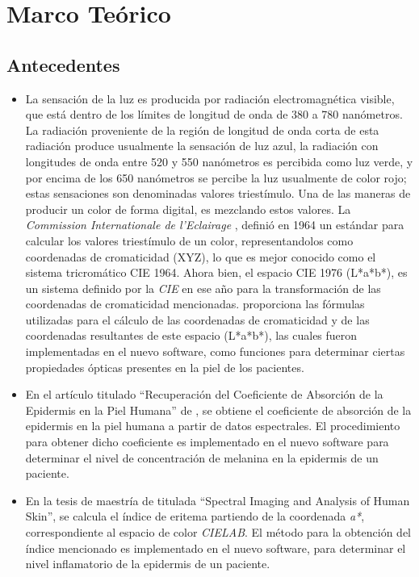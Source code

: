 \chapter{\label{cap:2}Marco Te\'{o}rico}

	\section{Antecedentes}	
		\begin{itemize}
		
			\item
				La sensaci\'{o}n de la luz es producida por radiaci\'{o}n electromagn\'{e}tica visible, que est\'{a} dentro de los l\'{i}mites de longitud de onda de 380 a 780 nan\'{o}metros. La radiaci\'{o}n proveniente de la regi\'{o}n de longitud de onda corta de esta radiaci\'{o}n produce usualmente la sensaci\'{o}n de luz azul, la radiaci\'{o}n con longitudes de onda entre 520 y 550 nan\'{o}metros es percibida como luz verde, y por encima de los 650 nan\'{o}metros se percibe la luz usualmente de color rojo; estas sensaciones son denominadas valores triest\'{i}mulo. Una de las maneras de producir un color de forma digital, es mezclando estos valores. La \textit{\mbox{Commission} Internationale de l'Eclairage} \cite{CIE}, defini\'{o} en 1964 un est\'{a}ndar para calcular los valores triest\'{i}mulo de un color, representandolos como coordenadas de cromaticidad (XYZ), lo que es mejor conocido como el sistema tricrom\'{a}tico CIE 1964. Ahora bien, el espacio CIE 1976 (L*a*b*), es un sistema definido por la \textit{CIE} en ese a\~{n}o para la \mbox{transformaci\'{o}n} de las coordenadas de cromaticidad mencionadas.\cite{Schanda} proporciona las f\'{o}rmulas utilizadas para el c\'{a}lculo de las coordenadas de cromaticidad y de las coordenadas resultantes de este espacio (L*a*b*), las cuales fueron implementadas en el nuevo software, como funciones para determinar ciertas propiedades \'{o}pticas presentes en la piel de los pacientes.
			
			\item En el art\'{i}culo titulado ``Recuperaci\'{o}n del Coeficiente de Absorci\'{o}n de la Epidermis en la Piel Humana'' de \cite{Narea}, se obtiene el coeficiente de absorci\'{o}n de la epidermis en la piel humana a partir de datos espectrales. El procedimiento para obtener dicho coeficiente es implementado en el nuevo software para determinar el nivel de concentraci\'{o}n de melanina en la epidermis de un paciente.
			
			\item En la tesis de maestr\'{i}a de \cite{Bersha} titulada ``Spectral Imaging and Analysis of Human Skin'', se calcula el \'{i}ndice de eritema partiendo de la coordenada \textit{a*}, correspondiente al espacio de color \textit{CIELAB}. El m\'{e}todo para la obtenci\'{o}n del \'{i}ndice mencionado es implementado en el nuevo software, para determinar el nivel inflamatorio de la epidermis de un paciente.
		\end{itemize}

